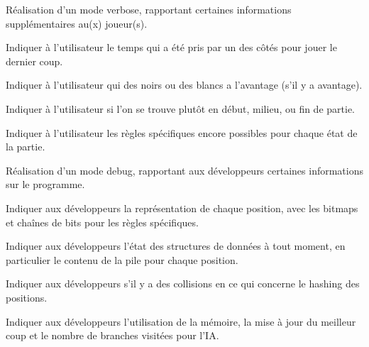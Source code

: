 \documentclass{article}
\begin{document}
\begin{needbox}
    Réalisation d'un mode verbose, rapportant certaines informations supplémentaires au(x) joueur(s).
    \begin{subneedbox}
        Indiquer à l'utilisateur le temps qui a été pris par un des côtés pour jouer le dernier coup.
    \end{subneedbox}
    \begin{subneedbox}
        Indiquer à l'utilisateur qui des noirs ou des blancs a l'avantage (s'il y a avantage).
    \end{subneedbox}
    \begin{subneedbox}
        Indiquer à l'utilisateur si l'on se trouve plutôt en début, milieu, ou fin de partie.
    \end{subneedbox}
    \begin{subneedbox}
        Indiquer à l'utilisateur les règles spécifiques encore possibles pour chaque état de la partie.
    \end{subneedbox}
\end{needbox}
    
\begin{needbox}
    Réalisation d'un mode debug, rapportant aux développeurs certaines informations sur le programme.
    \begin{subneedbox}
        Indiquer aux développeurs la représentation de chaque position, avec les bitmaps et chaînes de bits pour les
        règles spécifiques.
    \end{subneedbox}
    \begin{subneedbox}
        Indiquer aux développeurs l'état des structures de données à tout moment, en particulier le contenu de la pile pour chaque position.
    \end{subneedbox}
    \begin{subneedbox}
        Indiquer aux développeurs s'il y a des collisions en ce qui concerne le hashing des positions.
    \end{subneedbox}
    \begin{subneedbox}[F19.4: IA]
        Indiquer aux développeurs l'utilisation de la mémoire, la mise à jour du meilleur coup et le nombre de branches visitées pour l'IA.
    \end{subneedbox}
\end{needbox}
\end{document}
